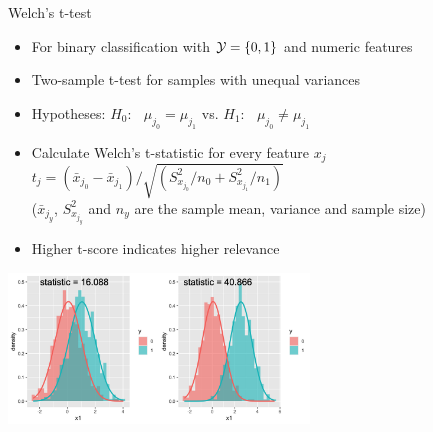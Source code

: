 \documentclass[11pt,compress,t,notes=noshow, xcolor=table]{beamer}
\begin{document}

  \begin{vbframe}{Welch's \MakeLowercase{t}-test}
  \begin{itemize}
  \setlength{\itemsep}{0.6em}
    \item For binary classification with $\mathcal{Y} = \{ 0, 1\}$ and numeric features
    \item Two-sample t-test for samples with unequal variances
   \item Hypotheses:
    $H_0$: $\;\;\mu_{j_0} = \mu_{j_1} $ \qquad vs. \qquad $H_1$: $\;\;\mu_{j_0} \neq \mu_{j_1}$

    \item Calculate Welch's t-statistic for every feature $x_j$
    $ t_j = (\bar{x}_{j_0} - \bar{x}_{j_1})/ \sqrt{(S^2_{x_{j_0}}/n_0 + S^2_{x_{j_1}}/n_1)}$\\
    ($\bar{x}_{j_y}$, $S^2_{x_{j_{y}}}$ and $n_y$ are the sample mean, %
    variance and sample size)
    \item Higher t-score indicates higher relevance
  \end{itemize}
\vspace{-0.01cm}
  \begin{center}
\includegraphics[width=0.6\textwidth, height=0.29\textheight]{figure/fs-t-test.png}
  \end{center}
  
  \end{vbframe}
\end{document}

